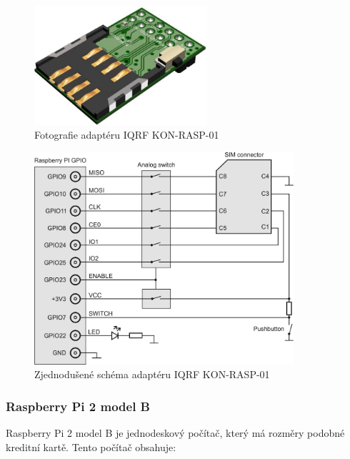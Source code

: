 \documentclass[12pt,a4paper,oneside]{article}
\begin{document}
\begin{figure}[H]
\centering
\label{fig:iqrf/fotka-kon-rasp-01}
\includegraphics[width = 64mm]{img/iqrf/kon-rasp-01.png}
\caption{Fotografie adaptéru IQRF KON-RASP-01}
\end{figure}

\begin{figure}[H]
\centering
\label{fig:iqrf/zjednodusene-schema-kon-rasp-01}
\includegraphics[width = 96mm]{img/iqrf/kon-rasp-01-zjednodusene-schema.png}
\caption{Zjednodušené schéma adaptéru IQRF KON-RASP-01}
\end{figure}

\subsubsection{Raspberry Pi 2 model B}

Raspberry Pi 2 model B je jednodeskový počítač, který má rozměry podobné kreditní kartě. Tento počítač obsahuje:
\end{document}
